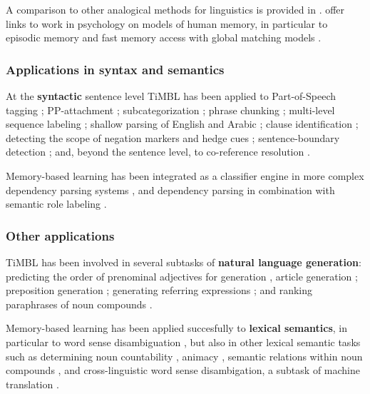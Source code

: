 \documentclass{book}
\begin{document}
A comparison to other analogical methods for linguistics is provided
in \cite{Daelemans+97f,Daelemans02}.  offer
links to work in psychology on models of human memory, in particular
to episodic memory and fast memory access with global matching models
\cite{Clark+96}.

\subsubsection{Applications in syntax and semantics}

At the {\bf syntactic} sentence level TiMBL has been applied to
Part-of-Speech tagging \cite{Daelemans+96b,Zavrel+99,Halteren+01,Griebenouw+19};
PP-attachment \cite{Zavrel+97b}; subcategorization \cite{Buchholz98};
phrase chunking \cite{Veenstra98,Sang+99}; multi-level sequence
labeling \cite{Chen+19}; shallow parsing of English
\cite{Daelemans+99a,Buchholz+99,Yeh00} and Arabic \cite{Azmi+10};
clause identification \cite{Orasan00,Sang01}; detecting the scope of
negation markers and hedge cues \cite{Morante+08c,Morante+09c};
sentence-boundary detection \cite{Stevenson+00}; and, beyond the
sentence level, to co-reference resolution
\cite{Preiss02,Mitkov+02,Hoste05,Klenner+08,Wunsch+09,Zhekova+11}.

Memory-based learning has been integrated as a classifier engine in
more complex dependency parsing systems
\cite{Nivre+04,Sagae+05,Canisius+06b}, and dependency parsing in
combination with semantic role labeling \cite{Morante+09b}.

\subsubsection{Other applications}

TiMBL has been involved in several subtasks of {\bf natural language
  generation}: predicting the order of prenominal adjectives for
generation \cite{Malouf00}, article generation \cite{Minnen+00};
preposition generation \cite{Lee+08b}; generating referring
expressions \cite{Hendrickx+08}; and ranking paraphrases of noun
compounds \cite{Wubben10}.

Memory-based learning has been applied succesfully to {\bf lexical
  semantics}, in particular to word sense disambiguation
\cite{Veenstra+00,Stevenson+99,Kokkinakis00,Mihalcea02,Hoste+02,DeCadt+04},
but also in other lexical semantic tasks such as determining noun
countability \cite{Baldwin+03}, animacy \cite{Orasan+01}, semantic
relations within noun compounds \cite{Kim+06b,Nastase+06}, and
cross-linguistic word sense disambigation, a subtask of machine
translation \cite{VanGompel10,VanGompel+13,VanGompel+14}.
\end{document}
